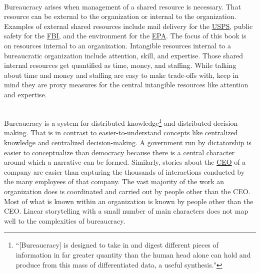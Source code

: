 \ \\

Bureaucracy arises when management of a shared resource is necessary.
That resource can be external to the organization or internal to the organization. Examples of external shared resources include mail delivery for the \href{https://en.wikipedia.org/wiki/United_States_Postal_Service}{USPS}, 
\iftoggle{WPinmargin}{\marginpar{$>$Wikipedia: USPS}}{}
public safety for the \href{https://en.wikipedia.org/wiki/Federal_Bureau_of_Investigation}{FBI}, 
and the environment for the \href{https://en.wikipedia.org/wiki/United_States_Environmental_Protection_Agency}{EPA}. 
The focus of this book is on resources internal to an organization. Intangible resources internal to a bureaucratic organization include attention, skill, and expertise. Those shared internal resources get quantified as time, money, and staffing. While talking about time and money and staffing are easy to make trade-offs with, keep in mind they are proxy measures for the central intangible resources like attention and expertise.

\ \\

Bureaucracy is a system for distributed knowledge\footnote{``[Bureaucracy] is designed to take in and digest different pieces of information in far greater quantity than the human head alone can hold and produce from this mass of differentiated data, a useful synthesis."\cite{1966_Morison}} 
and distributed decision-making. 
That is in contrast to easier-to-understand concepts like centralized knowledge and centralized decision-making. A government run by dictatorship is easier to conceptualize than democracy because there is a central character around which a narrative can be formed. Similarly, stories about the \href{https://en.wikipedia.org/wiki/Chief_executive_officer}{CEO} 
\iftoggle{WPinmargin}{\marginpar{$>$Wikipedia: Chief executive officer}}{}
of a company are easier than capturing the thousands of interactions conducted by the many employees of that company. The vast majority of the work an organization does is coordinated and carried out by people other than the CEO. Most of what is known within an organization is known by people other than the CEO. Linear storytelling with a small number of main characters does not map well to the complexities of bureaucracy. 


